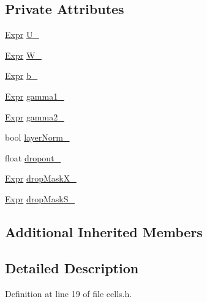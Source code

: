 \subsection*{Private Attributes}
\begin{DoxyCompactItemize}
\item 
\hyperlink{namespacemarian_a498d8baf75b754011078b890b39c8e12}{Expr} \hyperlink{classmarian_1_1rnn_1_1Tanh_a326263946a945185e8cf5c587383aa54}{U\+\_\+}
\item 
\hyperlink{namespacemarian_a498d8baf75b754011078b890b39c8e12}{Expr} \hyperlink{classmarian_1_1rnn_1_1Tanh_af63a9f22efde5a4011105da5c416bae9}{W\+\_\+}
\item 
\hyperlink{namespacemarian_a498d8baf75b754011078b890b39c8e12}{Expr} \hyperlink{classmarian_1_1rnn_1_1Tanh_a8270043cd7cbce1118b50835cce625ac}{b\+\_\+}
\item 
\hyperlink{namespacemarian_a498d8baf75b754011078b890b39c8e12}{Expr} \hyperlink{classmarian_1_1rnn_1_1Tanh_a9391688bd409c4682db1aa1ea35eb45d}{gamma1\+\_\+}
\item 
\hyperlink{namespacemarian_a498d8baf75b754011078b890b39c8e12}{Expr} \hyperlink{classmarian_1_1rnn_1_1Tanh_a0f3c652c0cf8ddb562e6686c8b3c3eda}{gamma2\+\_\+}
\item 
bool \hyperlink{classmarian_1_1rnn_1_1Tanh_a2f040a380c52e0d19f84e155d14f3967}{layer\+Norm\+\_\+}
\item 
float \hyperlink{classmarian_1_1rnn_1_1Tanh_a5b9decfd851bb6cc0b9c9ed4f5c14021}{dropout\+\_\+}
\item 
\hyperlink{namespacemarian_a498d8baf75b754011078b890b39c8e12}{Expr} \hyperlink{classmarian_1_1rnn_1_1Tanh_afd3088eacc5632be9741fd38a36375ed}{drop\+Mask\+X\+\_\+}
\item 
\hyperlink{namespacemarian_a498d8baf75b754011078b890b39c8e12}{Expr} \hyperlink{classmarian_1_1rnn_1_1Tanh_a2d63dd9420ab8be612c3f5a490afe289}{drop\+Mask\+S\+\_\+}
\end{DoxyCompactItemize}
\subsection*{Additional Inherited Members}


\subsection{Detailed Description}


Definition at line 19 of file cells.\+h.



